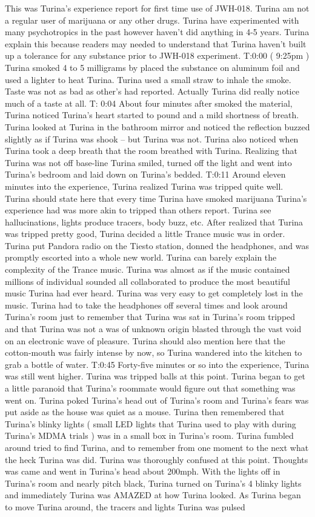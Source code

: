 \documentclass[12pt]{book}
\begin{document}
This was Turina's experience report for first time use of JWH-018. Turina am not a regular user of marijuana or any other drugs. Turina have experimented with many psychotropics in the past however haven't did anything in 4-5 years. Turina explain this because readers may needed to understand that Turina haven't built up a tolerance for any substance prior to JWH-018 experiment. T:0:00 ( 9:25pm ) Turina smoked 4 to 5 milligrams by placed the substance on aluminum foil and used a lighter to heat Turina. Turina used a small straw to inhale the smoke. Taste was not as bad as other's had reported. Actually Turina did really notice much of a taste at all. T: 0:04 About four minutes after smoked the material, Turina noticed Turina's heart started to pound and a mild shortness of breath. Turina looked at Turina in the bathroom mirror and noticed the reflection buzzed slightly as if Turina was shook -- but Turina was not. Turina also noticed when Turina took a deep breath that the room breathed with Turina. Realizing that Turina was not off base-line Turina smiled, turned off the light and went into Turina's bedroom and laid down on Turina's bedded. T:0:11 Around eleven minutes into the experience, Turina realized Turina was tripped quite well. Turina should state here that every time Turina have smoked marijuana Turina's experience had was more akin to tripped than others report. Turina see hallucinations, lights produce tracers, body buzz, etc. After realized that Turina was tripped pretty good, Turina decided a little Trance music was in order. Turina put Pandora radio on the Tiesto station, donned the headphones, and was promptly escorted into a whole new world. Turina can barely explain the complexity of the Trance music. Turina was almost as if the music contained millions of individual sounded all collaborated to produce the most beautiful music Turina had ever heard. Turina was very easy to get completely lost in the music. Turina had to take the headphones off several times and look around Turina's room just to remember that Turina was sat in Turina's room tripped and that Turina was not a was of unknown origin blasted through the vast void on an electronic wave of pleasure. Turina should also mention here that the cotton-mouth was fairly intense by now, so Turina wandered into the kitchen to grab a bottle of water. T:0:45 Forty-five minutes or so into the experience, Turina was still went higher. Turina was tripped balls at this point. Turina began to get a little paranoid that Turina's roommate would figure out that something was went on. Turina poked Turina's head out of Turina's room and Turina's fears was put aside as the house was quiet as a mouse. Turina then remembered that Turina's blinky lights ( small LED lights that Turina used to play with during Turina's MDMA trials ) was in a small box in Turina's room. Turina fumbled around tried to find Turina, and to remember from one moment to the next what the heck Turina was did. Turina was thoroughly confused at this point. Thoughts was came and went in Turina's head about 200mph. With the lights off in Turina's room and nearly pitch black, Turina turned on Turina's 4 blinky lights and immediately Turina was AMAZED at how Turina looked. As Turina began to move Turina around, the tracers and lights Turina was pulsed 
\end{document}

